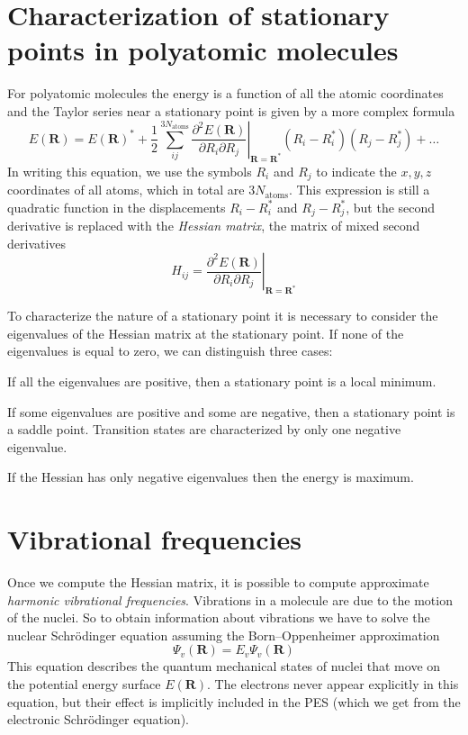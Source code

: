 \documentclass[../Main/chem371-notes.tex]{subfiles}
\begin{document}
\section{Characterization of stationary points in polyatomic molecules}

For polyatomic molecules the energy is a function of all the atomic coordinates and the Taylor series near a stationary point is given by a more complex formula
\begin{equation}
E(\mathbf{R}) =
E(\mathbf{R})^*
+\frac{1}{2}
\sum_{ij}^{3 N_\mathrm{atoms}} \left.\frac{\partial^2 E(\mathbf{R})}{\partial R_i \partial R_j}\right|_{\mathbf{R}=\mathbf{R}^*} (R_i - R_i^*) (R_j - R_j^*) + \ldots 
\end{equation}
In writing this equation, we use the symbols $R_i$ and $R_j$ to indicate the $x,y,z$ coordinates of all atoms, which in total are $3 N_\mathrm{atoms}$.
This expression is still a quadratic function in the displacements $R_i - R_i^*$ and $R_j - R_j^*$, but the second derivative is replaced with the \emph{Hessian matrix}, the matrix of mixed second derivatives
\begin{equation}
H_{ij} = 
\left.\frac{\partial^2 E(\mathbf{R})}{\partial R_i \partial R_j}\right|_{\mathbf{R}=\mathbf{R}^*}
\end{equation}

To characterize the nature of a stationary point it is necessary to consider the eigenvalues of the Hessian matrix at the stationary point.
If none of the eigenvalues is equal to zero, we can distinguish three cases:
\begin{myitems}
\item If all the eigenvalues are positive, then a stationary point is a local minimum.
\item If some eigenvalues are positive and some are negative, then a stationary point is a saddle point.
Transition states are characterized by only one negative eigenvalue.
\item If the Hessian has only negative eigenvalues then the energy is maximum.
\end{myitems}

\section{Vibrational frequencies}

Once we compute the Hessian matrix, it is possible to compute approximate \emph{harmonic vibrational frequencies}.
Vibrations in a molecule are due to the motion of the nuclei.
So to obtain information about vibrations we have to solve the nuclear Schr\"{o}dinger equation assuming the Born--Oppenheimer approximation
\begin{equation}
[\hat{T}_\mathrm{n} + E(\mathbf{R}) ] \Psi_v(\mathbf{R}) = E_v \Psi_v(\mathbf{R})
\end{equation}
This equation describes the quantum mechanical states of nuclei that move on the potential energy surface $E(\mathbf{R})$.
The electrons never appear explicitly in this equation, but their effect is implicitly included in the PES (which we get from the electronic Schr\"{o}dinger equation).
\end{document}
